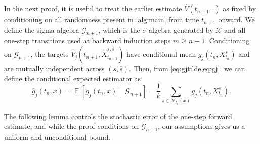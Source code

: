\documentclass[11pt,reqno,a4paper]{amsart}
\theoremstyle{definition}
\numberwithin{equation}{section}
\newcommand{\Mid}{\,\middle\vert \,}
\newcommand{\widebar}[1]{\overline{#1}}
\DeclareMathOperator{\E}{\mathbb{E}}
\DeclareMathOperator{\1}{\mathbbm{1}}
\begin{document}
In the next proof, it is useful to treat the earlier estimate $\widehat V(t_{n+1},\cdot)$ as fixed by conditioning on all randomness present in \cref{alg:main} from time $t_{n+1}$ onward. We define the sigma algebra $\mathcal G_{n+1}$, which is the $\sigma$-algebra generated by $\mathcal X$ and all one-step transitions used at backward induction steps $m \geq n+1$. Conditioning on $\mathcal{G}_{n+1}$, the targets $\widehat V_j(t_{n+1}, \widetilde X^{s,\hat s}_{t_{n+1}})$ have conditional mean $g_j(t_n,X^s_{t_n})$ and are mutually independent across $(s,\hat s)$.
Then, from  \cref{eq:gjtilde,eq:gj}, we can define the conditional expected estimator as
\begin{equation}\label{eq:gjbar}
  \widebar{g}_j(t_n,x) = \E \left [\widetilde{g}_j(t_n,x) \Mid \mathcal{G}_{n+1} \right ] = \frac{1}{k} \sum_{s \in \mathcal{N}_{t_n}(x)} g_j(t_n,X_{t_n}^{s}).
\end{equation}

The following lemma controls the stochastic error of the one-step forward estimate, and while the proof conditions on $\mathcal{G}_{n+1}$, our assumptions gives us a uniform and unconditional bound.
\end{document}
